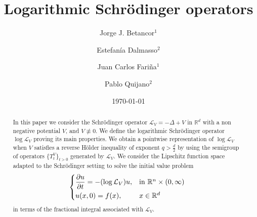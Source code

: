 \documentclass[10pt, a4paper, reqno]{amsart}
\theoremstyle{definition}
\theoremstyle{remark}
\numberwithin{equation}{section}
\begin{document}
	
	
	\title[Logarithmic Schr\"odinger operators]
	{Logarithmic Schr\"odinger operators}
	
	
	\author[J. J. Betancor]{Jorge J. Betancor$^1$}
        \address{$^1$Departamento de An\'alisis Matem\'atico, Universidad de La Laguna,\newline
	Campus de Anchieta, Avda. Astrof\'isico S\'anchez, s/n, La Laguna (Sta. Cruz de Tenerife), Spain}
	
	\author[E. Dalmasso]{Estefan\'ia Dalmasso$^{2}$}
	\address{$^2$Instituto de Matem\'atica Aplicada del Litoral, UNL, CONICET,     FIQ.\newline 
    Colectora Ruta Nac. Nº 168, Paraje El Pozo,\newline S3007ABA, Santa Fe, Argentina}

    \author[J. C. Fariña]{Juan Carlos Fariña$^1$}  
	
	\author[P. Quijano]{Pablo Quijano$^{2}$}
	
	\date{\today}
	

\begin{abstract}
    In this paper we consider the Schr\"odinger operator $\mathcal L_V= -\Delta + V$ in $\mathbb R^d$ with a non negative potential $V$, and $V\not\equiv 0$. We define the logarithmic Schr\"odinger operator $\log \mathcal L_V$ proving its main properties. We obtain a pointwise representation of $\log \mathcal L_V$ when $V$ satisfies a reverse H\"older inequality of exponent $q> \frac{d}{2}$ by using the semigroup of operators $\{T_t^V\}_{t>0}$ generated by $\mathcal L_V$. We consider the Lipschitz function space adapted to the Schr\"odinger setting to solve the initial value problem
    \[\begin{dcases*}
    \frac{\partial u}{\partial t}=-(\log\mathcal L_V)u, & $\text{in } \mathbb R^n\times (0,\infty)$ \\
    u(x,0)=f(x), & $x\in \mathbb R^d$
    \end{dcases*}\]
      in terms of the fractional integral associated with $\mathcal L_V$.
\end{abstract}
\end{document}
